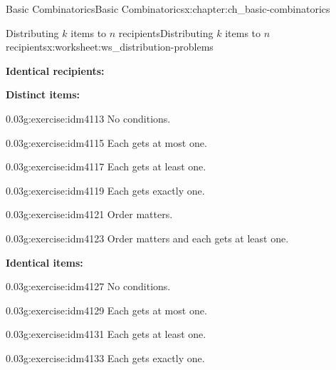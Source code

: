 \documentclass[oneside,10pt,]{book}
\newcommand{\terminology}[1]{\textbf{#1}}
\numberwithin{equation}{chapter}
\begin{document}
\begin{chapterptx}{Basic Combinatorics}{}{Basic Combinatorics}{}{}{x:chapter:ch_basic-combinatorics}
\begin{worksheet-section}{Distributing \(k\) items to \(n\) recipients}{}{Distributing \(k\) items to \(n\) recipients}{}{}{x:worksheet:ws_distribution-problems}
\begin{introduction}{}
\begin{sidebyside}{3}{0.0166666666666667}{0.0166666666666667}{0.0333333333333333}
\begin{sbspanel}{0.3}%
\par
\terminology{Identical recipients:}%
\end{sbspanel}%
\end{sidebyside}%
\end{introduction}%
\terminology{Distinct items:}%
\begin{divisionexercise}{1}{}{0.03}{g:exercise:idm4113}%
No conditions.%
\end{divisionexercise}%
\begin{divisionexercise}{2}{}{0.03}{g:exercise:idm4115}%
Each gets at most one.%
\end{divisionexercise}%
\begin{divisionexercise}{3}{}{0.03}{g:exercise:idm4117}%
Each gets at least one.%
\end{divisionexercise}%
\begin{divisionexercise}{4}{}{0.03}{g:exercise:idm4119}%
Each gets exactly one.%
\end{divisionexercise}%
\begin{divisionexercise}{5}{}{0.03}{g:exercise:idm4121}%
Order matters.%
\end{divisionexercise}%
\begin{divisionexercise}{6}{}{0.03}{g:exercise:idm4123}%
Order matters and each gets at least one.%
\end{divisionexercise}%
\terminology{Identical items:}%
\begin{divisionexercise}{7}{}{0.03}{g:exercise:idm4127}%
No conditions.%
\end{divisionexercise}%
\begin{divisionexercise}{8}{}{0.03}{g:exercise:idm4129}%
Each gets at most one.%
\end{divisionexercise}%
\begin{divisionexercise}{9}{}{0.03}{g:exercise:idm4131}%
Each gets at least one.%
\end{divisionexercise}%
\begin{divisionexercise}{10}{}{0.03}{g:exercise:idm4133}%
Each gets exactly one.%
\end{divisionexercise}%
\end{worksheet-section}
\restoregeometry
\end{chapterptx}
%
%
\typeout{************************************************}
\typeout{************************************************}
%
\end{document}
